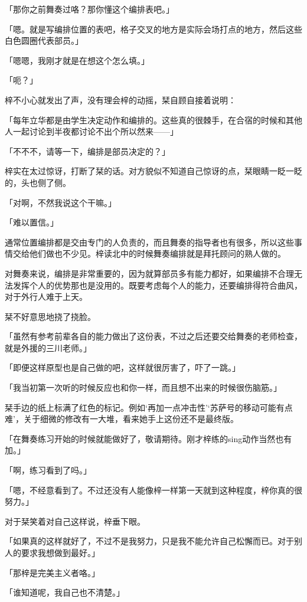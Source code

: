 \documentclass[UTF8]{ctexart}
\begin{document}
    「那你之前舞奏过咯？那你懂这个编排表吧。」

    「嗯。就是写编排位置的表吧，格子交叉的地方是实际会场打点的地方，然后这些白色圆圈代表部员。」

    「嗯嗯，我刚才就是在想这个怎么填。」

    「呃？」

    梓不小心就发出了声，没有理会梓的动摇，栞自顾自接着说明：

    「每年立华都是由学生决定动作和编排的。这些真的很棘手，在合宿的时候和其他人一起讨论到半夜都讨论不出个所以然来——」

    「不不不，请等一下，编排是部员决定的？」

    梓实在太过惊讶，打断了栞的话。对方貌似不知道自己惊讶的点，栞眼睛一眨一眨的，头也侧了侧。

    「对啊，不然我说这个干嘛。」

    「难以置信。」

    通常位置编排都是交由专门的人负责的，而且舞奏的指导者也有很多，所以这些事情交给他们做也不少见。梓读北中的时候舞奏编排就是拜托顾问的熟人做的。

    对舞奏来说，编排是非常重要的，因为就算部员多有能力都好，如果编排不合理无法发挥个人的优势那也是没用的。既要考虑每个人的能力，还要编排得符合曲风，对于外行人难于上天。

    栞不好意思地挠了挠脸。

    「虽然有参考前辈各自的能力做出了这份表，不过之后还要交给舞奏的老师检查，就是外援的三川老师。」

    「即便这样原型也是自己做的吧，这样就很厉害了，吓了一跳。」

    「我当初第一次听的时候反应也和你一样，而且想不出来的时候很伤脑筋。」

    栞手边的纸上标满了红色的标记。例如‘再加一点冲击性’‘苏萨号的移动可能有点难’，关于细微的修改有一大堆，看来她手上这份还不是最终版。

    「在舞奏练习开始的时候就能做好了，敬请期待。刚才梓练的sing动作当然也有加。」

    「啊，练习看到了吗。」

    「嗯，不经意看到了。不过还没有人能像梓一样第一天就到这种程度，梓你真的很努力。」

    对于栞笑着对自己这样说，梓垂下眼。

    「如果真的这样就好了，不过不是我努力，只是我不能允许自己松懈而已。对于别人的要求我想做到最好。」

    「那梓是完美主义者咯。」

    「谁知道呢，我自己也不清楚。」
\end{document}

